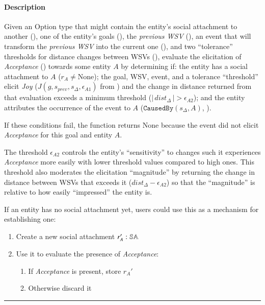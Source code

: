 \paragraph{Description} Given an Option type that might contain the entity's
social attachment to another (), one of the entity's
goals (), the \textit{previous WSV} (), an
event that will transform the \textit{previous WSV} into the current one
(), and two ``tolerance'' thresholds for distance
changes between WSVs (), evaluate
the elicitation of \textit{Acceptance} ()
towards some entity $A$ by determining if: the entity has a social attachment
to $A$ ($r_A \neq \text{None}$); the goal, WSV, event, and a tolerance
``threshold'' elicit \textit{Joy} ($J(g, s_{prev}, s_\Delta, \epsilon_{A1})$
from ) and the change in distance returned from that
evaluation exceeds a minimum threshold ($| \, dist_\Delta \, | >
\epsilon_{A2}$); and the entity attributes the occurrence of the event to $A$
($\mathtt{CausedBy}(s_\Delta, A)$, ).

If these conditions fail, the function returns None because the event did not
elicit \textit{Acceptance} for this goal and entity $A$.

The threshold $\epsilon_{A2}$ controls the entity's ``sensitivity'' to changes
such it experiences \textit{Acceptance} more easily with lower threshold values
compared to high ones. This threshold also moderates the elicitation
``magnitude'' by returning the change in distance between WSVs that exceeds it
($dist_\Delta - \epsilon_{A2}$) so that the ``magnitude'' is relative to how
easily ``impressed'' the entity is.

If an entity has no social attachment yet, users could use this as a mechanism
for establishing one:
\begin{enumerate}
    \item Create a new social attachment $r_A' : \mathbb{SA}$
    \item Use it to evaluate the presence of \textit{Acceptance}:
    \begin{enumerate}[noitemsep]
        \item If \textit{Acceptance} is present, store $r_A'$
        \item Otherwise discard it
    \end{enumerate}
\end{enumerate} \hrule

